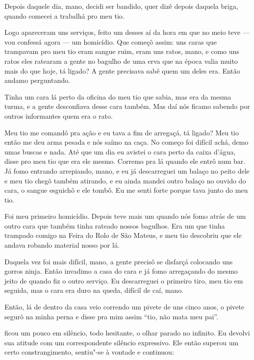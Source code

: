 Depois daquele dia, mano, decidi ser bandido, quer dizê depois daquela
briga, quando comecei a trabalhá pro meu tio.

Logo apareceram uns serviços, feito um desses aí da hora em que no meio
teve --- vou confessá agora --- um homicídio. Que começô assim: uns
caras que trampavam pro meu tio eram sangue ruim, eram uns ratos, mano,
e como uns ratos eles ratearam a gente no bagulho de uma erva que na
época valia muito mais do que hoje, tá ligado? A gente precisava sabê
quem um deles era. Então andamo perguntando.

Tinha um cara lá perto da oficina do meu tio que sabia, mas era da mesma
turma, e a gente desconfiava desse cara também. Mas daí nós ficamo
sabendo por outros informantes quem era o rato.

Meu tio me comandô pra ação e eu tava a fim de arregaçá, tá ligado? Meu
tio então me deu arma pesada e nós saímo na caça. No começo foi difícil
achá, demo umas buscas e nada. Até que um dia eu avistei o cara perto da
caixa d'água, disse pro meu tio que era ele mesmo. Corremo pra lá quando
ele entrô num bar. Já fomo entrando arrepiando, mano, e eu já
descarreguei um balaço no peito dele e meu tio chegô também atirando, e
eu ainda mandei outro balaço no ouvido do cara, o sangue esguichô e ele
tombô. Eu me senti forte porque tava junto do meu tio.

Foi meu primeiro homicídio. Depois teve mais um quando nós fomo atrás de
um outro cara que também tinha rateado nossos bagulhos. Era um que tinha
trampado comigo na Feira do Rolo de São Mateus, e meu tio descobriu que
ele andava robando material nosso por lá.

Daquela vez foi mais difícil, mano, a gente precisô se disfarçá
colocando uns gorros ninja. Então invadimo a casa do cara e já fomo
arregaçando do mesmo jeito de quando fiz o outro serviço. Eu
descarreguei o primeiro tiro, meu tio em seguida, mas o cara era duro na
queda, difícil de caí, mano.

Então, lá de dentro da casa veio correndo um pivete de uns cinco anos, o
pivete segurô na minha perna e disse pra mim assim ``tio, não mata meu
pai''.

\asterisc{}

 ficou um pouco em silêncio, todo hesitante, o olhar parado no
infinito. Eu devolvi sua atitude com um correspondente silêncio
expressivo. Ele então superou um certo constrangimento, sentiu"-se à
vontade e continuou:

\asterisc{}

